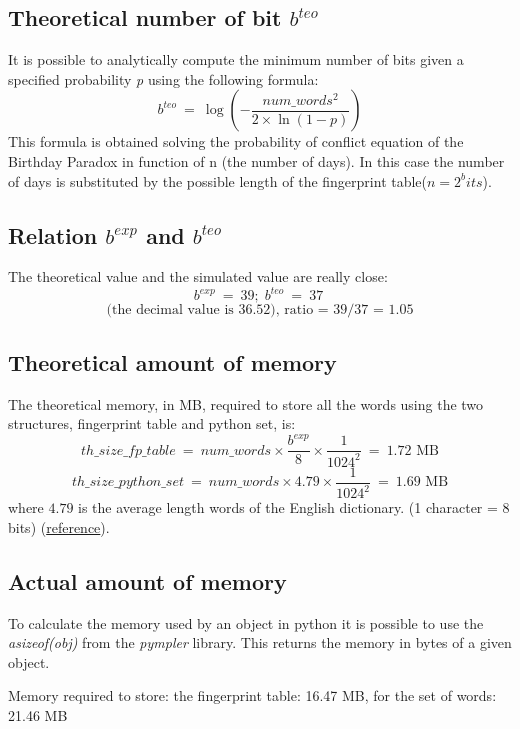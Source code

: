 \documentclass[twocolumn,letterpaper]{report}
\begin{document}
{			\subsection{Theoretical number of bit $b^{teo}$}
					It is possible to analytically compute the minimum number of bits given a specified probability \emph{p} using the following formula:
					\[
							b^{teo} \: = \: \log{ \left( - \frac{num\_words^2}{2\times \ln\left({1-p}\right)} \right)}
					\]
					This formula is obtained solving the probability of conflict equation of the Birthday Paradox in function of n (the number of days). In this case the number of days is substituted by the possible length of the fingerprint table($n=2^bits$).
					
			\subsection{Relation $b^{exp}$ and $b^{teo}$}
					The theoretical value and the simulated value are really close: 
					\[
							b^{exp} \: = \: 39; \; 	b^{teo} \: = \: 37 \:  
					\]
			\[ \text{(the decimal value is 36.52), ratio = 39/37 = 1.05} \]
			
			\subsection{Theoretical amount of memory}
			The theoretical memory, in MB, required to store all the words using the two structures, fingerprint table and python set, is:
			\[th\_size\_fp\_table \: = \: num\_words \times \frac{b^{exp}}{8} \times \frac{1}{1024^2}\: = \: 1.72 \text{ MB}\] 
			\[th\_size\_python\_set \: = \: num\_words \times 4.79 \times \frac{1}{1024^2} \: = \: 1.69 \text{ MB}\] 
			where $4.79$ is the average length words of the English dictionary. (1 character = 8 bits) (\href{http://norvig.com/mayzner.html}{reference}).
						
			\subsection{Actual amount of memory}
			To calculate the memory used by an object in python it is possible to use the \emph{asizeof(obj)} from the \emph{pympler} library. This returns the memory in bytes of a given object.
			\begin{center}
					Memory required to store: the fingerprint table: 16.47 MB, for the set of words: 21.46 MB
			\end{center}
			
}
\end{document}
